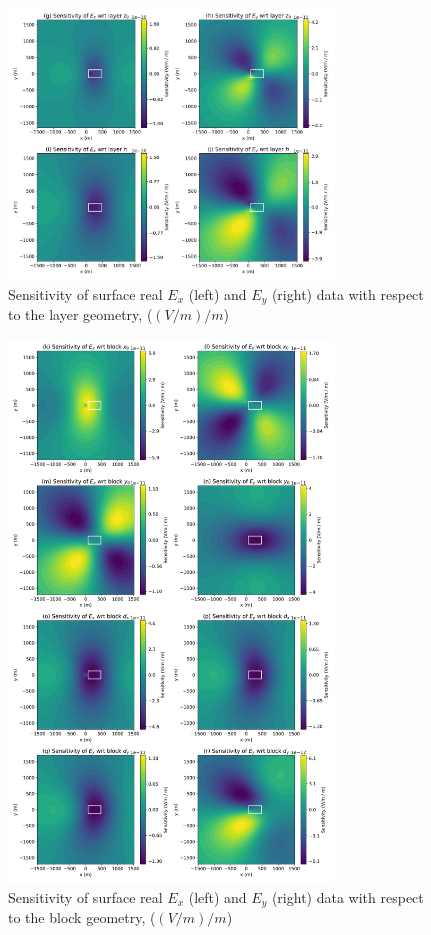 \documentclass[preprint,review,3p,times,onecolumn,authoryear]{elsarticle}
\begin{document}
{%
\begin{figure}[htb!]
    \centering
    \includegraphics[width=0.77\textwidth]{images/J_layer.png}
\caption{Sensitivity of surface real $E_x$ (left) and $E_y$ (right) data with respect to the layer geometry, ($(V /m) / m$)}
\label{fig:J_layer}
\end{figure}
}

{%
\begin{figure}[htb!]
    \centering
    \includegraphics[width=0.77\textwidth]{images/J_block.png}
\caption{Sensitivity of surface real $E_x$ (left) and $E_y$ (right) data with respect to the block geometry, ($(V /m) / m$)}
\label{fig:J_block}
\end{figure}
}
\end{document}
